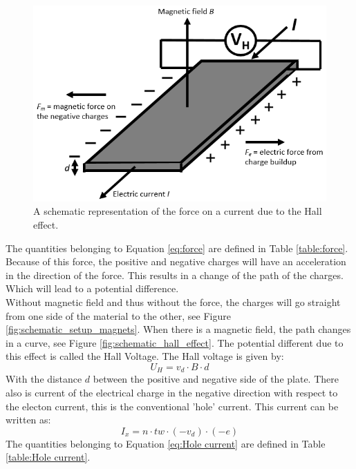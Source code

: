 \begin{figure} [!htbp]
    \centering
    \includegraphics[scale=0.7]{figuren/schematic_forces.png}
    \caption{A schematic representation of the force on a current due to the Hall effect.}
    \label{fig:schematic_force}
\end{figure}
The quantities belonging to Equation \ref{eq:force} are defined in Table \ref{table:force}.
Because of this force, the positive and negative charges will have an acceleration in the direction of the force. This results in a change of the path of the charges. Which will lead to a potential difference.\\
Without magnetic field and thus without the force, the charges will go straight from one side of the material to the other, see Figure \ref{fig:schematic_setup_magnets}. When there is a magnetic field, the path changes in a curve, see Figure \ref{fig:schematic_hall_effect}. The potential different due to this effect is called the Hall Voltage. The Hall voltage is given by:
    \begin{equation}
        U_H = v_d\cdot B \cdot d
        \label{eq:Hall voltage}
    \end{equation}
With the distance $d$ between the positive and negative side of the plate. 
There also is current of the electrical charge in the negative direction with respect to the electon current, this is the conventional 'hole' current. This current can be written as:
    \begin{equation}
        I_x = n\cdot tw\cdot (-v_d)\cdot (-e)
        \label{eq:Hole current}
    \end{equation}
The quantities belonging to Equation \ref{eq:Hole current} are defined in Table \ref{table:Hole current}.
